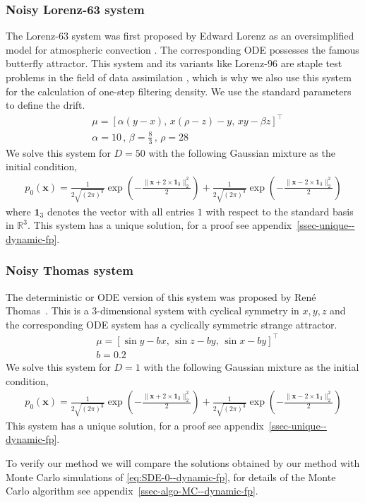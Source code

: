 \subsubsection{Noisy Lorenz-63 system}\label{ssec-63--dynamic-fp} The Lorenz-63 system was first proposed by Edward Lorenz 
as an oversimplified model for atmospheric convection \cite{lorenz1963deterministic}. The corresponding ODE possesses the famous butterfly attractor.
This system and its variants like Lorenz-96 are staple test problems in the field of data assimilation \cite{carrassi2022data}, \cite{yeong2020particle} which is why we also use this system for the calculation of one-step filtering density. We use the standard parameters to define the drift.
\begin{equation}
\begin{aligned}
    &\mu=[\alpha (y-x),\, x(\rho-z) - y,\, xy - \beta z]^\top\\
    &\alpha = 10 \,, \, \beta = \frac{8}{3}\,, \, \rho=28 \
\end{aligned}\label{eq:mu-L63--dynamic-fp}
\end{equation}
We solve this system for $D=50$ with the following Gaussian mixture as the initial condition,
\begin{align}
    p_0(\mathbf x)=\frac{1}{2\sqrt{(2\pi)^3}}\exp\left(-\frac{\|\mathbf x + 2\times\mathbf 1_3\|_2^2}{2}\right) + \frac{1}{2\sqrt{(2\pi)^3}}\exp\left(-\frac{\|\mathbf x - 2\times\mathbf 1_3\|_2^2}{2}\right)\label{eq:p0-L63--dynamic-fp}
\end{align}
where $\mathbf 1_3$ denotes the vector with all entries $1$ with respect to the standard basis in $\mathbb R^3$. This system has a unique solution, for a proof see appendix~\ref{ssec-unique--dynamic-fp}.
\subsubsection{Noisy Thomas system}\label{ssec-Thomas--dynamic-fp}
The deterministic or ODE version of this system was proposed by René Thomas~\cite{thomas1999deterministic}. This is a 3-dimensional system with cyclical symmetry in $x, y, z$ and the corresponding ODE system has a cyclically symmetric strange attractor.
\begin{equation}
\begin{aligned}
    &\mu=[\sin y - bx,\, \sin z - by,\, \sin x - by ]^\top\\
    &b =  0.2 
\end{aligned}\label{eq:mu-Thomas--dynamic-fp}
\end{equation}
We solve this system for $D=1$ with the following Gaussian mixture as the initial condition,
\begin{align}
    p_0(\mathbf x)=\frac{1}{2\sqrt{(2\pi)^3}}\exp\left(-\frac{\|\mathbf x + 2\times\mathbf 1_3\|_2^2}{2}\right) + \frac{1}{2\sqrt{(2\pi)^3}}\exp\left(-\frac{\|\mathbf x - 2\times\mathbf 1_3\|_2^2}{2}\right)\label{eq:p0-Thomas--dynamic-fp}
\end{align}
This system has a unique solution, for a proof see appendix~\ref{ssec-unique--dynamic-fp}.

To verify our method we will compare the solutions obtained by our method with Monte Carlo simulations of \ref{eq:SDE-0--dynamic-fp}, for details of the Monte Carlo algorithm see appendix~\ref{ssec-algo-MC--dynamic-fp}. 

